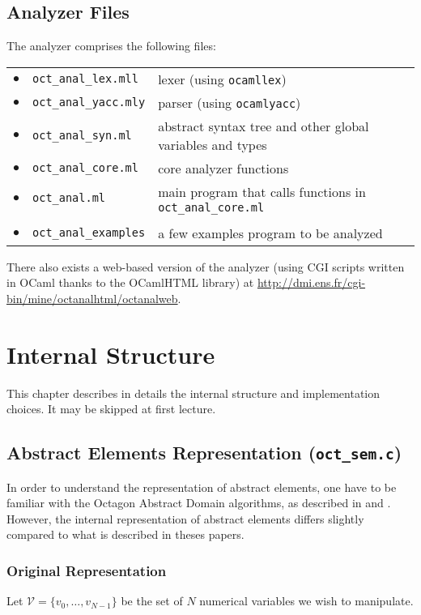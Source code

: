 \documentclass[twosides]{report}
\begin{document}
\section{Analyzer Files}

The analyzer comprises the following files:\\
\begin{tabular}{lll}
$\bullet$ & {\tt oct\_anal\_lex.mll} & lexer (using {\tt ocamllex})\\
$\bullet$ & {\tt oct\_anal\_yacc.mly} & parser (using {\tt ocamlyacc})\\
$\bullet$ & {\tt oct\_anal\_syn.ml} & abstract syntax tree and other
global variables and types\\
$\bullet$ & {\tt oct\_anal\_core.ml} & core analyzer functions\\
$\bullet$ & {\tt oct\_anal.ml} & main program that calls functions
in {\tt oct\_anal\_core.ml}\\\\
$\bullet$ & {\tt oct\_anal\_examples} & a few examples program to be analyzed
\end{tabular}

\bigskip

There also exists a web-based version of the analyzer (using CGI scripts
written in OCaml thanks to the OCamlHTML library) at
\url{http://dmi.ens.fr/cgi-bin/mine/octanalhtml/octanalweb}.


\cleardoublepage
\chapter{Internal Structure}

This chapter describes in details the internal structure and implementation
choices. It may be skipped at first lecture.


\section{Abstract Elements Representation ({\tt oct\_sem.c})}
\label{matrixinternal}

In order to understand the representation of abstract elements, one have to be
familiar with the Octagon Abstract Domain algorithms, as described in
\cite{mine:dea} and \cite{mine:ast01}.
However, the internal representation of abstract elements differs slightly
compared to what is described in theses papers.

\subsection{Original Representation}
Let $\mathcal{V}=\{v_0,\ldots,v_{N-1}\}$ be the set of $N$ numerical variables
we wish to manipulate.
\end{document}
